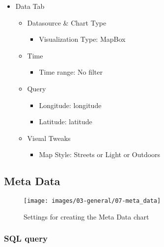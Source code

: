 \documentclass[
]{book}
\providecommand{\tightlist}{%
  \setlength{\itemsep}{0pt}\setlength{\parskip}{0pt}}
\begin{document}
\begin{itemize}
\tightlist
\item
  Data Tab

  \begin{itemize}
  \tightlist
  \item
    Datasource \& Chart Type

    \begin{itemize}
    \tightlist
    \item
      Visualization Type: MapBox
    \end{itemize}
  \item
    Time

    \begin{itemize}
    \tightlist
    \item
      Time range: No filter
    \end{itemize}
  \item
    Query

    \begin{itemize}
    \tightlist
    \item
      Longitude: longitude
    \item
      Latitude: latitude
    \end{itemize}
  \item
    Visual Tweaks

    \begin{itemize}
    \tightlist
    \item
      Map Style: Streets or Light or Outdoors
    \end{itemize}
  \end{itemize}
\end{itemize}

\hypertarget{metaDataTable}{%
\subsection*{Meta Data}\label{metaDataTable}}

\begin{figure}
\texttt{[image: images/03-general/07-meta\_data]} \caption{Settings for creating the Meta Data chart}\label{fig:metaData}
\end{figure}

\hypertarget{sql-query-13}{%
\subsubsection*{SQL query}\label{sql-query-13}}
\end{document}
